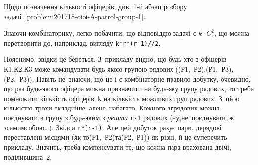 \Tutorial
Щодо позначення кількості офіцерів, див. \mbox{1-й} абзац розбору задачі~\ref{problem:201718-oioi-A-patrol-group-1}.

Знаючи комбінаторику, легко побачити, що відповіддю задачі є $k\cdot{}C_r^2$, що можна перетворити до, наприклад, вигляду \verb"k*r*(r-1)//2". 

Пояснимо, звідки це береться.
З~прикладу видно, що будь-хто з офіцерів
\mbox{К1},\nolinebreak[3] \mbox{К2},\nolinebreak[3] \mbox{К3}
може командувати будь-якою групою рядових 
(\mbox{(Р1, Р2)},\nolinebreak[3] \mbox{(Р1, Р3)},\nolinebreak[3] \mbox{(Р2, Р3)}).
Навіть не~знаючи, що це і є комбінаторне правило добутку, очевидно, що раз будь-якого офіцера можна призначити на будь-яку групу рядових, то треба помножити кількість офіцерів~\texttt{k} на кількість можливих груп рядових. З~цією кількістю трохи складніше, але\nolinebreak[3] не~набагато. Кожного з\nolinebreak[3] \texttt{r}\nolinebreak[3] рядових можна поєднувати в групу з будь-яким з \emph{решти} \mbox{\texttt{r-1}} рядових (ну,\nolinebreak[3] не~поєднувати~ж з\nolinebreak[3] самим\nolinebreak[3] собою\dots). Звідси \texttt{r*(r-1)}. Але цей добуток рахує пари, де\nolinebreak[2] рядові переставлені місцями (\mbox{як-то}\nolinebreak[3] \mbox{(Р1, Р2)}\nolinebreak[2] та\nolinebreak[3] \mbox{(Р2, Р1)}) як різні, й це суперечить пр\'{и}кладу. Значить, треба компенсувати те, що кожна пара врахована двічі, поділивши\nolinebreak[3] на~2.